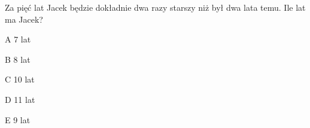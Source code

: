 \begin{tresc}
Za pięć lat Jacek będzie dokładnie dwa razy starszy niż był dwa lata temu. Ile lat ma Jacek?
\end{tresc}
\begin{wariant}{A} 7 lat \end{wariant}
\begin{wariant}{B} 8 lat \end{wariant}
\begin{wariant}{C} 10 lat \end{wariant}
\begin{wariant}{D} 11 lat \end{wariant}
\begin{wariant}{E} 9 lat \end{wariant}
